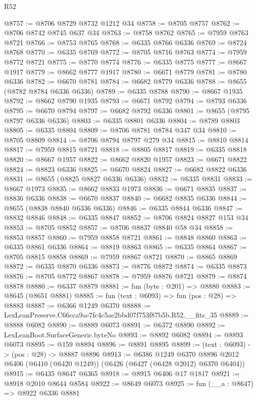 \begin{lexlean}{R52}
\begin{coremodule}
@8757 := @8706 @8729 @8732 @1212 @34
@8758 := @8705 @8757
@8762 := @8706 @8742 @8745 @637 @34
@8763 := @8758 @8762
@8765 := @7959 @8763 @8721
@8766 := @8753 @8765
@8768 := @6335 @8766 @6336
@8769 := @8724 @8768
@8770 := @6335 @8769
@8772 := @8705 @8716 @8763
@8774 := @7959 @8772 @8721
@8775 := @8770 @8774
@8776 := @6335 @8775
@8777 := @8667 @1917
@8779 := @8662 @8777 @1917
@8780 := @6671 @8779
@8781 := @8780 @6336
@8782 := @6670 @8781
@8784 := @6682 @8779 @6336
@8788 := @8655 (@8782 @8784 @6336 @6336)
@8789 := @6335 @8788
@8790 := @8667 @1935
@8792 := @8662 @8790 @1935
@8793 := @6671 @8792
@8794 := @8793 @6336
@8795 := @6670 @8794
@8797 := @6682 @8792 @6336
@8801 := @8655 (@8795 @8797 @6336 @6336)
@8803 := @6335 @8801 @6336
@8804 := @8789 @8803
@8805 := @6335 @8804
@8809 := @8706 @8781 @8784 @347 @34
@8810 := @8705 @8809
@8814 := @8706 @8794 @8797 @279 @34
@8815 := @8810 @8814
@8817 := @7959 @8815 @8721
@8818 := @8805 @8817
@8819 := @6335 @8818
@8820 := @8667 @1957
@8822 := @8662 @8820 @1957
@8823 := @6671 @8822
@8824 := @8823 @6336
@8825 := @6670 @8824
@8827 := @6682 @8822 @6336
@8831 := @8655 (@8825 @8827 @6336 @6336)
@8832 := @6335 @8831
@8833 := @8667 @1973
@8835 := @8662 @8833 @1973
@8836 := @6671 @8835
@8837 := @8836 @6336
@8838 := @6670 @8837
@8840 := @6682 @8835 @6336
@8844 := @8655 (@8838 @8840 @6336 @6336)
@8846 := @6335 @8844 @6336
@8847 := @8832 @8846
@8848 := @6335 @8847
@8852 := @8706 @8824 @8827 @153 @34
@8853 := @8705 @8852
@8857 := @8706 @8837 @8840 @58 @34
@8858 := @8853 @8857
@8860 := @7959 @8858 @8721
@8861 := @8848 @8860
@8863 := @6335 @8861 @6336
@8864 := @8819 @8863
@8865 := @6335 @8864
@8867 := @8705 @8815 @8858
@8869 := @7959 @8867 @8721
@8870 := @8865 @8869
@8872 := @6335 @8870 @6336
@8873 := @8776 @8872
@8874 := @6335 @8873
@8876 := @8705 @8772 @8867
@8878 := @7959 @8876 @8721
@8879 := @8874 @8878
@8880 := @6337 @8879
@8881 := fun (byte : @201) => @8880
@8883 := @8645 (@8651 @8881)
@8885 := fun (text : @6093) => fun (pos : @28) => @8883
@8887 := @6366 @1249 @6370
@8888 := LexLeanPreserve.C66cca9ac7fc4c5ae2bbd07f753f87b5b.R52.__fits_35
@8889 := @8888 @6082
@8890 := @8889 @6073
@8891 := @6372 @8890
@8892 := LexLeanBoot.SurfaceGeneric.byteNo
@8893 := @8892 @6082
@8894 := @8893 @6073
@8895 := @159 @8894
@8896 := @8891 @8895
@8899 := (text : @6093) -> (pos : @28) -> @8887 @8896
@8913 := @6386
    @1249
    @6370
    @8896
    @2012
    @6406
    (@6410 (@6420 @1249))
    (@6426 (@6427 (@6428 @2012) @6370 @6404))
@8915 := @6435 @8647 @6365
@8918 := @8915 @6406 @17 @1817
@8921 := @8918 @2010 @8644 @8584
@8922 := @8649 @6073
@8925 := fun (__a : @8647) => @8922 @6336 @8881

\end{coremodule}
\end{lexlean}
